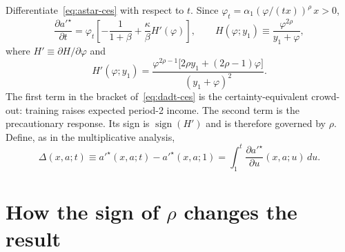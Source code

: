 \documentclass[12pt]{article}
\begin{document}
Differentiate~\eqref{eq:astar-ces} with respect to $t$. Since $\varphi_t=\alpha_1(\varphi/(tx))^{\rho}\,x>0$,
\begin{equation}
    \frac{\partial a'^{\star}}{\partial t}
    =
    \varphi_t
    \left[
        -\frac{1}{1+\beta}
        +\frac{\kappa}{\beta}H'(\varphi)
    \right],
    \qquad
    H(\varphi;y_1)\equiv\frac{\varphi^{2\rho}}{y_1+\varphi},
    \label{eq:dadt-ces}
\end{equation}
where $H'\equiv\partial H/\partial\varphi$ and
\begin{equation}
    H'(\varphi;y_1)
    =
    \frac{\varphi^{2\rho-1}\bigl[2\rho y_1+(2\rho-1)\varphi\bigr]}{(y_1+\varphi)^2}.
    \label{eq:Hprime}
\end{equation}
The first term in the bracket of~\eqref{eq:dadt-ces} is the certainty-equivalent crowd-out: training raises expected period-2 income. The second term is the precautionary response. Its sign is $\operatorname{sign}(H')$ and is therefore governed by $\rho$. Define, as in the multiplicative analysis,
\begin{equation}
    \Delta(x,a;t)
    \equiv
    a'^{\star}(x,a;t)-a'^{\star}(x,a;1)
    =
    \int_1^t \frac{\partial a'^{\star}}{\partial u}(x,a;u)\,du.
\end{equation}

\section{How the sign of $\rho$ changes the result}
\end{document}
